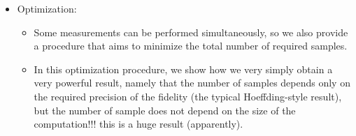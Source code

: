 \documentclass[a4paper,unpublished,onecolumn,11pt]{quantumarticle}
\begin{document}
\begin{itemize}
\begin{itemize}
    \end{itemize}
    \item Optimization:
    \begin{itemize}
        \item Some measurements can be performed simultaneously, so we also provide a procedure that aims to minimize the total number of required samples.
        \item In this optimization procedure, we show how we very simply obtain a very powerful result, namely that the number of samples depends only on the required precision of the fidelity (the typical Hoeffding-style result), but the number of sample does not depend on the size of the computation!!! this is a huge result (apparently).
    \end{itemize}
\end{itemize}
\end{document}
